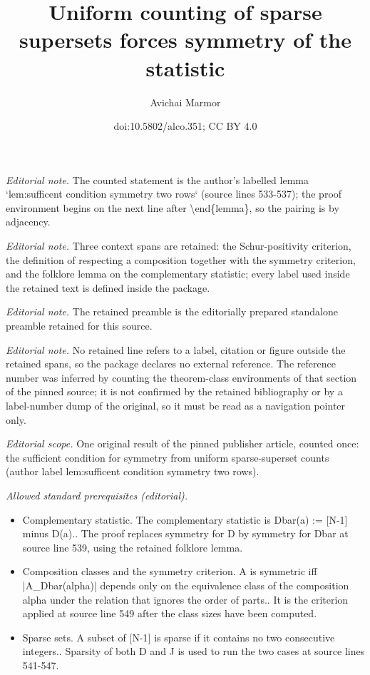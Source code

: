 \documentclass[11pt]{article}
\title{Uniform counting of sparse supersets forces symmetry of the statistic}
\author{Avichai Marmor}
\date{doi:10.5802/alco.351; CC BY 4.0}
\theoremstyle{definition}
\numberwithin{equation}{section}
\begin{document}
\maketitle
\noindent\textit{Editorial note.} The counted statement is the author's labelled lemma `lem:sufficent condition symmetry two rows` (source lines 533-537); the proof environment begins on the next line after \textbackslash{}end\{lemma\}, so the pairing is by adjacency.\par\medskip
\noindent\textit{Editorial note.} Three context spans are retained: the Schur-positivity criterion, the definition of respecting a composition together with the symmetry criterion, and the folklore lemma on the complementary statistic; every label used inside the retained text is defined inside the package.\par\medskip
\noindent\textit{Editorial note.} The retained preamble is the editorially prepared standalone preamble retained for this source.\par\medskip
\noindent\textit{Editorial note.} No retained line refers to a label, citation or figure outside the retained spans, so the package declares no external reference. The reference number was inferred by counting the theorem-class environments of that section of the pinned source; it is not confirmed by the retained bibliography or by a label-number dump of the original, so it must be read as a navigation pointer only.\par\medskip
\noindent\textit{Editorial scope.} One original result of the pinned publisher article, counted once: the sufficient condition for symmetry from uniform sparse-superset counts (author label lem:sufficent condition symmetry two rows).\par\medskip
\noindent\textit{Allowed standard prerequisites (editorial).}\begin{itemize}
\item Complementary statistic. The complementary statistic is Dbar(a) := [N-1] minus D(a).. The proof replaces symmetry for D by symmetry for Dbar at source line 539, using the retained folklore lemma.
\item Composition classes and the symmetry criterion. A is symmetric iff |A\_Dbar(alpha)| depends only on the equivalence class of the composition alpha under the relation that ignores the order of parts.. It is the criterion applied at source line 549 after the class sizes have been computed.
\item Sparse sets. A subset of [N-1] is sparse if it contains no two consecutive integers.. Sparsity of both D and J is used to run the two cases at source lines 541-547.
\end{itemize}\medskip
\end{document}
